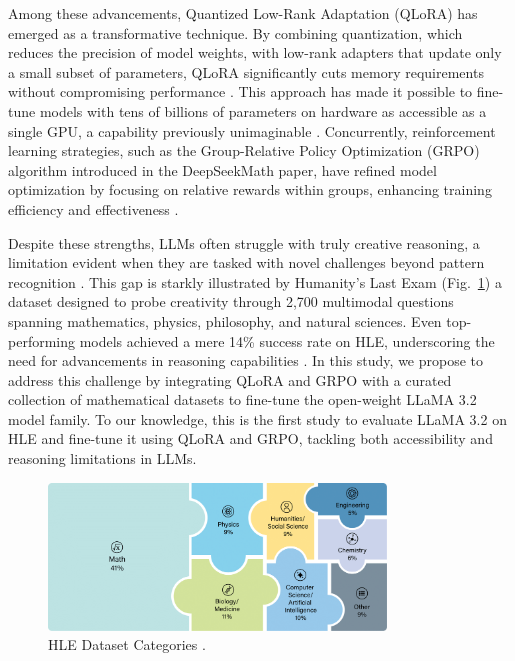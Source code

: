 \documentclass{svproc}
\begin{document}
Among these advancements, Quantized Low-Rank Adaptation (QLoRA) has emerged as a transformative technique. By combining quantization, which reduces the precision of model weights, with low-rank adapters that update only a small subset of parameters, QLoRA significantly cuts memory requirements without compromising performance \cite{dettmers2023qloraefficientfinetuningquantized}. This approach has made it possible to fine-tune models with tens of billions of parameters on hardware as accessible as a single GPU, a capability previously unimaginable \cite{dettmers2023qloraefficientfinetuningquantized}. Concurrently, reinforcement learning strategies, such as the Group-Relative Policy Optimization (GRPO) algorithm introduced in the DeepSeekMath paper, have refined model optimization by focusing on relative rewards within groups, enhancing training efficiency and effectiveness \cite{shao2024deepseekmathpushinglimitsmathematical}.

Despite these strengths, LLMs often struggle with truly creative reasoning, a limitation evident when they are tasked with novel challenges beyond pattern recognition \cite{deutsch2011beginning}. This gap is starkly illustrated by Humanity’s Last Exam (Fig.~\ref{fig:hle_categories}) a dataset designed to probe creativity through 2,700 multimodal questions spanning mathematics, physics, philosophy, and natural sciences. Even top-performing models achieved a mere 14\% success rate on HLE, underscoring the need for advancements in reasoning capabilities \cite{phan2025humanitysexam}. In this study, we propose to address this challenge by integrating QLoRA and GRPO with a curated collection of mathematical datasets to fine-tune the open-weight LLaMA 3.2 model family. To our knowledge, this is the first study to evaluate LLaMA 3.2 on HLE and fine-tune it using QLoRA and GRPO, tackling both accessibility and reasoning limitations in LLMs.

\begin{figure}[H]
  \centering
  \includegraphics[width=0.8\textwidth]{.assets/dataset.png}
  \caption{HLE Dataset Categories \cite{phan2025humanitysexam}.}
  \label{fig:hle_categories}
\end{figure}
\end{document}
